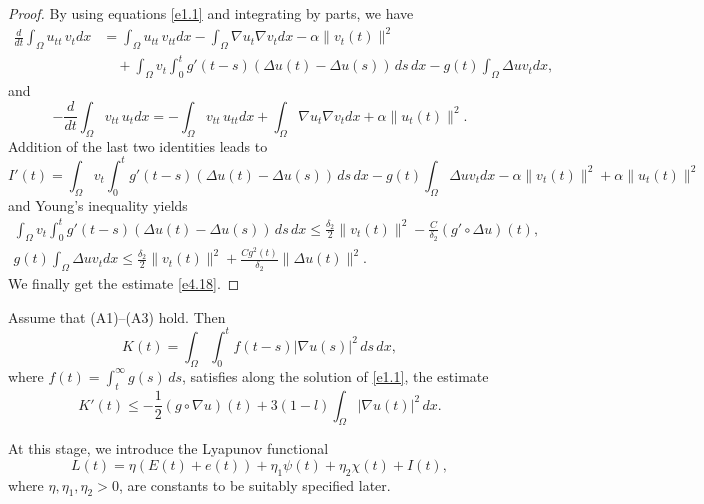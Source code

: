 \documentclass[reqno]{amsart}
\begin{document}
\begin{proof}
By using equations \eqref{e1.1} and integrating by parts, we have
\begin{align*}
 \frac{d}{dt}\int_{\Omega} u_{tt} \, v_t dx
& =\int_{\Omega} u_{tt} \, v_{tt} dx -\int_{\Omega} \nabla u_t \nabla v_t dx
 - \alpha \| v_t (t) \|^2 \\
&\quad  +\int_{\Omega} v_t \int_0^t g'(t - s)(\Delta u(t) - \Delta u(s)) \, ds\,dx
- g(t) \int_{\Omega} \Delta u v_t dx,
\end{align*}
and
\begin{equation*}
- \frac{d}{dt}\int_{\Omega} v_{tt} \, u_t dx= -\int_{\Omega} v_{tt} \, u_{tt} dx
+\int_{\Omega} \nabla u_t \nabla v_t dx + \alpha \| u_t (t)\|^2.
\end{equation*}
Addition of the last two identities leads to
\[
I'(t)= \int_{\Omega} v_t \int_0^t g'(t - s)(\Delta u(t)
- \Delta u(s)) \, ds\,dx- g(t) \int_{\Omega} \Delta u v_t dx
 - \alpha \| v_t(t) \|^2 + \alpha \| u_t(t) \|^2
\]
and Young's inequality yields
\begin{gather*}
\int_{\Omega} v_t \int_0^t g'(t - s)(\Delta u(t) - \Delta u(s)) \, ds\,dx
\leq \frac{\delta_2}{2} \| v_t(t) \|^2- \frac{ C}{\delta_2}
(g' \circ \Delta u)(t),
\\
 g(t) \int_{\Omega} \Delta u v_t dx \leq \frac{\delta_2}{2} \| v_t(t) \|^2
 + \frac{Cg^2(t)}{ \delta_2} \| \Delta u (t) \|^2.
\end{gather*}
 We finally get the estimate \eqref{e4.18}.
\end{proof}

\begin{lemma} \label{lem10}
 Assume that {\rm (A1)--(A3)}  hold.
Then
\[
 K(t) = \int_{\Omega} \int_0^t f(t - s) |\nabla u(s)|^2 \, ds \, dx,
\]
where $f(t) = \int_{t}^{\infty} g(s) \, ds$, satisfies along the solution
of \eqref{e1.1}, the estimate
\begin{equation}
K'(t) \leq -\frac{1}{2} (g \circ \nabla u)(t)
+ 3(1 - l) \int_{\Omega} |\nabla u(t)|^2 \, dx.   \label{e4.19}
\end{equation}
\end{lemma}

At this stage, we introduce the Lyapunov functional
\begin{equation}
 L(t) = \eta( E(t)+ e(t) )+ \eta_1 \psi(t) + \eta_2 \chi(t)+ I(t), \label{e4.20}
\end{equation}
where $ \eta , \eta_1, \eta_2> 0$, are constants to be suitably specified later.
\end{document}
